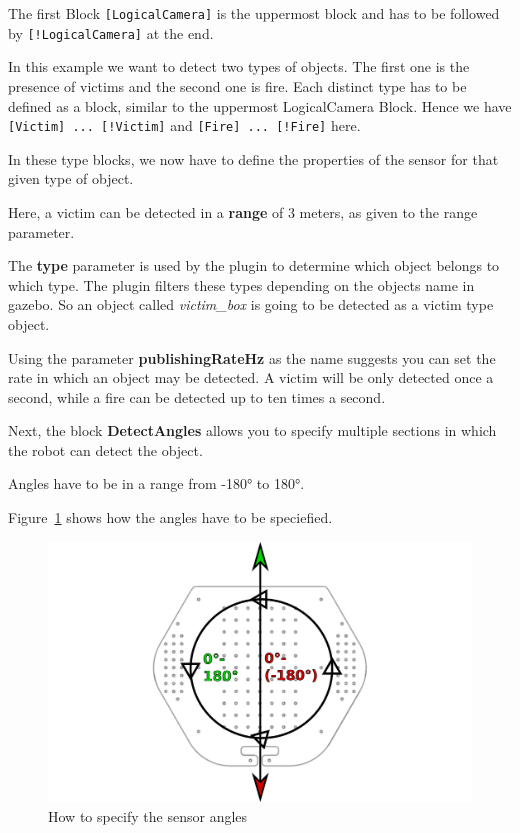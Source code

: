 The first Block \verb$[LogicalCamera]$ is the uppermost block and has to be followed by \verb$[!LogicalCamera]$ at the end.

In this example we want to detect two types of objects. The first one is the presence of victims and the second one is fire. Each distinct type has to be defined as a block, similar to the uppermost LogicalCamera Block. Hence we have \verb$[Victim] ... [!Victim]$ and \verb$[Fire] ... [!Fire]$ here.

In these type blocks, we now have to define the properties of the sensor for that given type of object.

Here, a victim can be detected in a \textbf{range} of 3 meters, as given to  the range parameter.

The \textbf{type} parameter is used by the plugin to determine which object belongs to which type. The plugin filters these types depending on the objects name in gazebo. So an object called \textit{victim\_box} is going to be detected as a victim type object.

Using the parameter \textbf{publishingRateHz} as the name suggests you can set the rate in which an object may be detected. A victim will be only detected once a second, while a fire can be detected up to ten times a second.

Next, the block \textbf{DetectAngles} allows you to specify multiple sections in which the robot can detect the object.

Angles have to be in a range from -180° to 180°.

Figure~\ref{fig:TurtleBotSensorAngles} shows how the angles have to be speciefied.

\begin{figure}[htbp]
  \includegraphics[width=1.0\textwidth]{ttbangles.pdf}
  \caption{How to specify the sensor angles}
  \label{fig:TurtleBotSensorAngles}
\end{figure}

